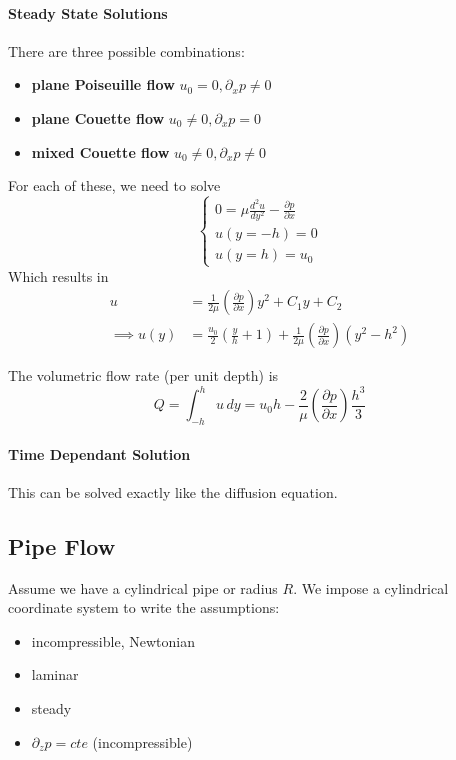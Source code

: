 \paragraph{Steady State Solutions}
There are three possible combinations:
\begin{itemize}
	\setlength{\itemsep}{-5pt}
	\item \textbf{plane Poiseuille flow} $u_0=0,\partial_xp \ne 0$\\
	\item \textbf{plane Couette flow} $u_0\ne0 ,\partial_xp =0$\\
	\item \textbf{mixed Couette flow} $u_0\ne0,\partial_xp \ne 0$
\end{itemize}

For each of these, we need to solve
\begin{equation*}
	\begin{cases}
		0=\mu \frac{d^2u}{dy^2}- \frac{\partial p}{\partial x}\\
		u(y=-h) = 0\\
		u(y=h) = u_0
	\end{cases}
\end{equation*}
Which results in 
\begin{equation*}
	\begin{split}
		u &= \frac{1}{2\mu}\left(\frac{\partial p}{\partial x}\right) y^2 + C_1 y + C_2\\\implies
		u(y)&=\frac{u_0}{2}\left(\frac{y}{h} + 1\right)+ \frac{1}{2\mu }\left(\frac{\partial p}{\partial x}\right)\left(y^2 -h^2\right)
	\end{split}
\end{equation*}

The volumetric flow rate (per unit depth) is 
\begin{equation*}
	Q= \int_{-h}^h u\,dy = u_0 h- \frac{2}{\mu} \left(\frac{\partial p}{\partial x}\right)\frac{h^3}{3}
\end{equation*}
\paragraph{Time Dependant Solution}
This can be solved exactly like the diffusion equation. 
\subsection{Pipe Flow}
Assume we have a cylindrical pipe or radius $R$. We impose a cylindrical coordinate system to write the assumptions:
\begin{itemize}
	\setlength{\itemsep}{-5pt}
	\item incompressible,  Newtonian
	\item laminar
	\item steady
	\item $\partial_z p = cte$ (incompressible)
\end{itemize}

